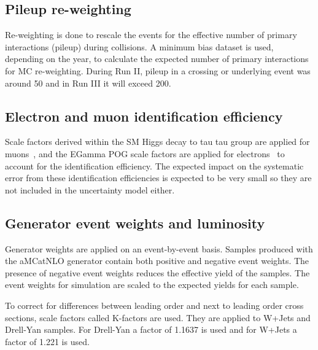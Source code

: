 \subsection{Pileup re-weighting}
\label{sec:pileup}

Re-weighting is done to rescale the events for the effective number of primary interactions (pileup) during collisions. A minimum bias dataset is used, depending on the year, to calculate the expected number of primary interactions for MC re-weighting.
During Run II, pileup in a crossing or underlying event was around 50 and in Run III it will exceed 200.   

\subsection{Electron and muon identification efficiency}

Scale factors derived within the SM Higgs decay to tau tau group are applied for muons~\cite{SMHTTarXiv}, and the EGamma POG scale factors are applied for electrons~\cite{EGammaMVAID} to account for the identification efficiency. The expected impact on the systematic error from these identification efficiencies is expected to be very small so they are not included in the uncertainty model either.
  


\subsection{Generator event weights and luminosity}

Generator weights are applied on an event-by-event basis. Samples produced with the aMCatNLO generator contain both positive and negative event weights. The presence of negative event weights reduces the effective yield of the samples. The event weights for simulation are scaled to the expected yields for each sample. 

To correct for differences between leading order and next to leading order cross sections, scale factors called K-factors are used. They are applied to W+Jets and Drell-Yan samples. For Drell-Yan a factor of 1.1637 is used and for W+Jets a factor of 1.221 is used.

